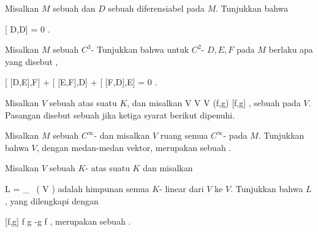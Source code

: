 {}
{

Misalkan $M$ sebuah
dan $D$ sebuah
diferensiabel pada $M$. Tunjukkan bahwa

\mavergleichskette
{\vergleichskette
{ [ D,D]
}
{ =} { 0
}
{  }{
}
{    }{
}
{   }{
}
}
{}{}{.}

}
{} {}

{}
{

Misalkan $M$ sebuah
$C^3$-
Tunjukkan bahwa untuk
$C^2$-
$D,E,F$ pada $M$ berlaku apa yang disebut  {},

\mavergleichskettedisp
{\vergleichskette
{ [ [D,E],F] + [ [E,F],D] + [ [F,D],E]
}
{ =} { 0
}
{ } {
}
{ } {
}
{ } {
}
}
{}{}{.}

}
{} {}

Misalkan $V$ sebuah
atas suatu
$K$, dan misalkan
\maabbeledisp {} {V \times V} { V
} {(f,g)} { [f,g]
} {,}
sebuah
pada $V$. Pasangan
 disebut sebuah
jika ketiga syarat berikut dipenuhi.

{}
{

Misalkan $M$ sebuah
$C^\infty$-
dan misalkan $V$ ruang semua
$C^\infty$-
pada $M$. Tunjukkan bahwa $V$, dengan
medan-medan vektor, merupakan sebuah
.

}
{} {}

{}
{

Misalkan $V$ sebuah
$K$-
atas suatu
$K$ dan misalkan

\mavergleichskettedisp
{\vergleichskette
{ L
}
{ =} { _{  } \, ( V )
}
{ } {
}
{ } {
}
{ } {
}
}
{}{}{}
adalah himpunan semua
$K$-
linear dari $V$ ke $V$. Tunjukkan bahwa $L$, yang dilengkapi dengan

\mavergleichskettedisp
{\vergleichskette
{ [f,g]
}
{ } { f \circ g -g \circ f
}
{ } {
}
{ } {
}
{ } {
}
}
{}{}{,}
merupakan sebuah
.

}
{} {}


